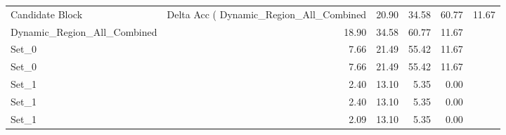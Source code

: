 \begin{tabular}{lrrrr}
\toprule
Candidate Block & Delta Acc (%
\midrule
Dynamic_Region_All_Combined & 20.90 & 34.58 & 60.77 & 11.67 \\
Dynamic_Region_All_Combined & 18.90 & 34.58 & 60.77 & 11.67 \\
Set_0 & 7.66 & 21.49 & 55.42 & 11.67 \\
Set_0 & 7.66 & 21.49 & 55.42 & 11.67 \\
Set_1 & 2.40 & 13.10 & 5.35 & 0.00 \\
Set_1 & 2.40 & 13.10 & 5.35 & 0.00 \\
Set_1 & 2.09 & 13.10 & 5.35 & 0.00 \\
\bottomrule
\end{tabular}
